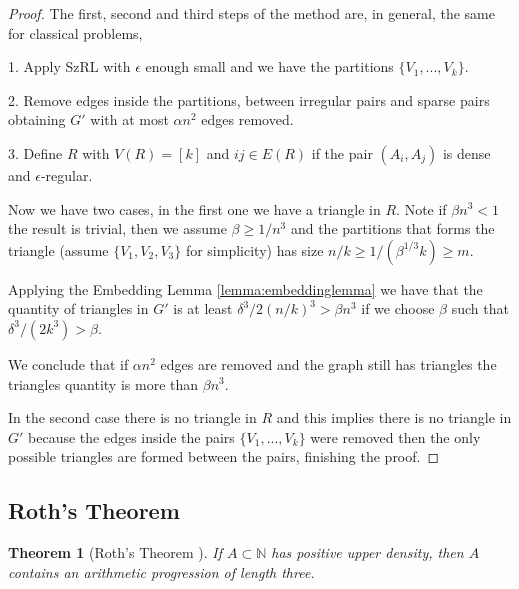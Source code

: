 \documentclass[12pt,twoside,a4paper]{book}
\numberwithin{equation}{section}
\newtheorem{theorem}             {Theorem}[section]
\theoremstyle{remark}
\begin{document}
\begin{proof}
The first, second and third steps of the method are, in general, the same for classical problems,

1. Apply SzRL with $\epsilon$ enough small and we have the partitions $\{V_1, ... , V_k\}$.

2. Remove edges inside the partitions, between irregular pairs and sparse pairs obtaining $G'$ with at most $\alpha n^2$ edges removed.

3. Define $R$ with $V(R) = [k]$ and $ij \in E(R) $ if  the pair $(A_i, A_j)$ is dense and $\epsilon$-regular.

Now we have two cases, in the first one we have a triangle in $R$. Note if $\beta n^3 < 1$ the result is trivial, then we assume $\beta \geq 1/n^3$ and the partitions that forms the triangle (assume $\{V_1, V_2, V_3\}$ for simplicity) has size $n/k \geq 1/(\beta ^{1/3} k) \geq m$.

Applying the Embedding Lemma \ref{lemma:embeddinglemma} we have that the quantity of triangles in $G'$ is at least $\delta ^3 /2 (n/k)^3 > \beta n^3$ if we choose $\beta$ such that $\delta ^3 / (2k^3) > \beta$.

We conclude that if $\alpha n^2$ edges are removed and the graph still has triangles the triangles quantity is more than $\beta n^3$.

In the second case there is no triangle in $R$ and this implies there is no triangle in $G'$ because the edges inside the pairs $\{V_1, ... , V_k\}$ were removed then the only possible triangles are formed between the pairs, finishing the proof.
\end{proof}


\subsection{Roth's Theorem}

\begin{theorem}[{Roth's Theorem \cite{Ro53}}] If $A \subset \mathbb{N}$ has positive upper density, then $A$ contains an arithmetic progression of length three. 
\end{theorem}
\end{document}
